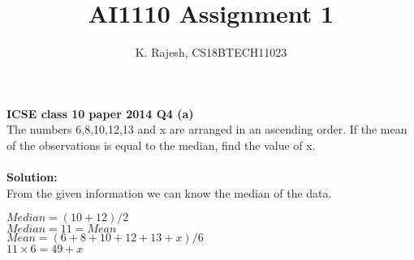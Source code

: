 \documentclass[journal, 11pt, twocolumn]{IEEEtran}
\title{\twelve AI1110 Assignment 1}
\author{K. Rajesh, CS18BTECH11023}
\begin{document}
    \maketitle
    \textbf{ICSE class 10 paper 2014 Q4 (a)}\\
    The numbers 6,8,10,12,13 and x are arranged in an ascending order. If the mean of the observations is equal to the median, find the value of x.\\\\
    \textbf{Solution:}\\
    From the given information we can know the median of the data.\\
    \begin{center}
    $Median = (10+12)/2$\\
    $Median = 11 = Mean$\\
    $Mean = (6+8+10+12+13+x)/6$\\
    $11 \times 6 = 49 + x$\\
    \end{center}
\end{document}
